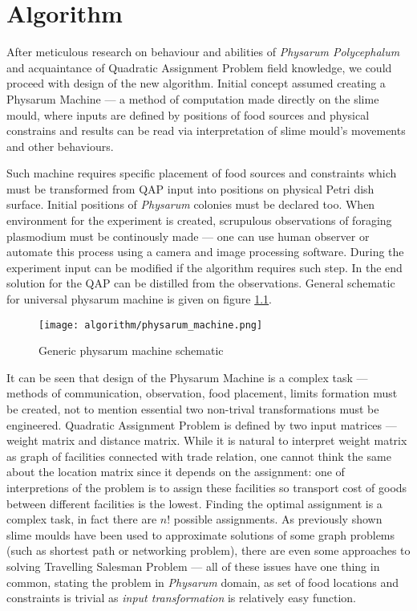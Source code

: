\chapter{Algorithm}
\label{chapter:algorithm}

After meticulous research on behaviour and abilities of \textit{Physarum Polycephalum} and acquaintance of Quadratic Assignment Problem field knowledge, we could proceed with design of the new algorithm. Initial concept assumed creating a Physarum Machine --- a method of computation made directly on the slime mould, where inputs are defined by positions of food sources and physical constrains and results can be read via interpretation of slime mould's movements and other behaviours.

Such machine requires specific placement of food sources and constraints which must be transformed from QAP input into positions on physical Petri dish surface. Initial positions of \textit{Physarum} colonies must be declared too. When environment for the experiment is created, scrupulous observations of foraging plasmodium must be continously made --- one can use human observer or automate this process using a camera and image processing software. During the experiment input can be modified if the algorithm requires such step. In the end solution for the QAP can be distilled from the observations. General schematic for universal physarum machine is given on figure \ref{figure:a_machine}.

\begin{figure}
  \centering
  \texttt{[image: algorithm/physarum\_machine.png]}
  \caption{Generic physarum machine schematic}
  \label{figure:a_machine}
\end{figure}

It can be seen that design of the Physarum Machine is a complex task --- methods of communication, observation, food placement, limits formation must be created, not to mention essential two non-trival transformations must be engineered. Quadratic Assignment Problem is defined by two input matrices --- weight matrix and distance matrix. While it is natural to interpret weight matrix as graph of facilities connected with trade relation, one cannot think the same about the location matrix since it depends on the assignment: one of interpretions of the problem is to assign these facilities so transport cost of goods between different facilities is the lowest. Finding the optimal assignment is a complex task, in fact there are $n!$ possible assignments. As previously shown slime moulds have been used to approximate solutions of some graph problems (such as shortest path or networking problem), there are even some approaches to solving Travelling Salesman Problem --- all of these issues have one thing in common, stating the problem in \textit{Physarum} domain, as set of food locations and constraints is trivial as \textit{input transformation} is relatively easy function. 

